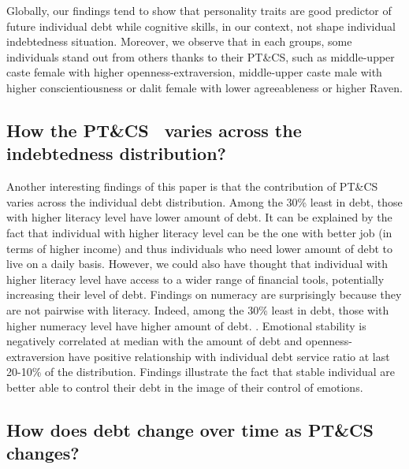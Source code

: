 \documentclass[a4paper, 11pt, onecolumn]{article}
\newcommand{\PTCS}{PT\&CS}
\begin{document}
Globally, our findings tend to show that personality traits are good predictor of future individual debt while cognitive skills, in our context, not shape individual indebtedness situation.
Moreover, we observe that in each groups, some individuals stand out from others thanks to their \PTCS, such as 
middle-upper caste female with higher openness-extraversion, middle-upper caste male with higher conscientiousness or dalit female with lower agreeableness or higher Raven.



	\subsection{How the \PTCS~ varies across the indebtedness distribution?}

Another interesting findings of this paper is that the contribution of \PTCS~ varies across the individual debt distribution.
Among the 30\% least in debt, those with higher literacy level have lower amount of debt.
It can be explained by the fact that individual with higher literacy level can be the one with better job (in terms of higher income) and thus individuals who need lower amount of debt to live on a daily basis. 
However, we could also have thought that individual with higher literacy level have access to a wider range of financial tools, potentially increasing their level of debt.
Findings on numeracy are surprisingly because they are not pairwise with literacy.
Indeed, among the 30\% least in debt, those with higher numeracy level have higher amount of debt.
.
Emotional stability is negatively correlated at median with the amount of debt and openness-extraversion have positive relationship with individual debt service ratio at last 20-10\% of the distribution.
Findings illustrate the fact that stable individual are better able to control their debt in the image of their control of emotions.




	\subsection{How does debt change over time as \PTCS~ changes?}
\end{document}
